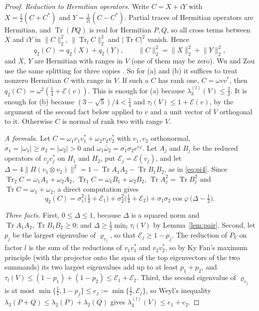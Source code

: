\documentclass[11pt]{article}
\theoremstyle{remark}
\newcommand{\Tr}{\operatorname{Tr}}
\newcommand{\norm}[1]{\lVert #1\rVert}
\begin{document}
\begin{proof}
\emph{Reduction to Hermitian operators.} Write $C=X+iY$ with $X=\frac12(C+C^*)$ and $Y=\frac1{2i}(C-C^*)$. Partial
traces of Hermitian operators are Hermitian, and $\Tr(PQ)$ is real for Hermitian $P,Q$, so all cross terms between $X$
and $iY$ in $\norm{C}_2^2$, $\norm{\Tr_lC}_2^2$ and $|\Tr C|^2$ vanish. Hence
\[
q_2(C)=q_2(X)+q_2(Y),\qquad\norm{C}_2^2=\norm{X}_2^2+\norm{Y}_2^2 ,
\]
and $X$, $Y$ are Hermitian with ranges in $V$ (one of them may be zero). Wu and Zou use the same splitting for three
copies \cite[Cor.~6.2]{WuZou}. So for (a) and (b) it suffices to treat nonzero Hermitian $C$ with range in $V$.
If such a $C$ has rank one, $C=\omega vv^*$, then $q_2(C)=\omega^2(\frac14+\mathcal E(v))$. This is enough for (a)
because $\lambda_3^{(l)}(V)\le\frac23$. It is enough for (b) because $(3-\sqrt5)/4<\frac14$ and
$\tau_l(V)\le1+\mathcal E(v)$, by the argument of the second fact below applied to $v$ and a unit vector of $V$
orthogonal to it. Otherwise $C$ is normal of rank two with range $V$.

\emph{A formula.} Let $C=\omega_1v_1v_1^*+\omega_2v_2v_2^*$ with $v_1,v_2$ orthonormal,
$\sigma_1=|\omega_1|\ge\sigma_2=|\omega_2|>0$ and $\omega_1\bar\omega_2=\sigma_1\sigma_2e^{i\varphi}$. Let $A_j$ and $B_j$
be the reduced operators of $v_jv_j^*$ on $H_1$ and $H_2$, put $\mathcal E_j=\mathcal E(v_j)$, and let
$\Delta=4\norm{\Pi(v_1\otimes v_2)}^2=1-\Tr A_1A_2-\Tr B_1B_2$, as in \eqref{eq:pi4}. Since
$\Tr_2C=\omega_1A_1+\omega_2A_2$, $\Tr_1C=\omega_1B_1+\omega_2B_2$, $\Tr A_j^2=\Tr B_j^2$ and $\Tr C=\omega_1+\omega_2$,
a direct computation gives
\begin{equation}\label{eq:normal}
q_2(C)=\sigma_1^2\big(\tfrac14+\mathcal E_1\big)+\sigma_2^2\big(\tfrac14+\mathcal E_2\big)
+\sigma_1\sigma_2\cos\varphi\,\big(\Delta-\tfrac12\big).
\end{equation}

\emph{Three facts.} First, $0\le\Delta\le1$, because $\Delta$ is a squared norm and $\Tr A_1A_2,\Tr B_1B_2\ge0$; and
$\Delta\ge\frac12\min_l\tau_l(V)$ by Lemma~\ref{lem:pair}. Second, let $p_j$ be the largest eigenvalue of
$\varrho_{v_j}$, so that $\mathcal E_j\ge1-p_j$. The reduction of $P_V$ on factor $l$ is the sum of the reductions of
$v_1v_1^*$ and $v_2v_2^*$, so by Ky Fan's maximum principle (with the projector onto the span of the top eigenvectors of
the two summands) its two largest eigenvalues add up to at least $p_1+p_2$, and
$\tau_l(V)\le(1-p_1)+(1-p_2)\le\mathcal E_1+\mathcal E_2$. Third, the second eigenvalue of $\varrho_{v_j}$ is at most
$\min\{\frac12,1-p_j\}\le e_j:=\min\{\frac12,\mathcal E_j\}$, so Weyl's inequality
$\lambda_3(P+Q)\le\lambda_2(P)+\lambda_2(Q)$ gives $\lambda_3^{(l)}(V)\le e_1+e_2$.


\end{proof}
\end{document}
